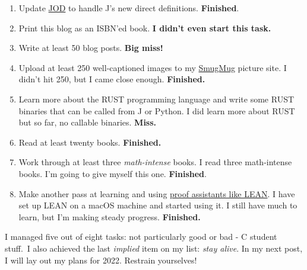 \begin{enumerate}
\def\labelenumi{\arabic{enumi}.}
\tightlist
\item
  Update
  \href{https://analyzethedatanotthedrivel.org/the-jod-page/}{JOD} to
  handle J's new direct definitions. \textbf{Finished}.
\item
  Print this blog as an ISBN'ed book. \textbf{I didn't even start this
  task.}
\item
  Write at least 50 blog posts. \textbf{Big miss!}
\item
  Upload at least 250 well-captioned images to my
  \href{https://conceptcontrol.smugmug.com/}{SmugMug} picture site. I
  didn't hit 250, but I came close enough. \textbf{Finished.}
\item
  Learn more about the RUST programming language and write some RUST
  binaries that can be called from J or Python. I did learn more about
  RUST but so far, no callable binaries. \textbf{Miss.}
\item
  Read at least twenty books. \textbf{Finished.}
\item
  Work through at least three \emph{math-intense} books. I read three
  math-intense books. I'm going to give myself this one.
  \textbf{Finished}.
\item
  Make another pass at learning and using
  \href{https://leanprover-community.github.io/}{proof assistants like
  LEAN}. I have set up LEAN on a macOS machine and started using it. I
  still have much to learn, but I'm making steady progress.
  \textbf{Finished.}
\end{enumerate}

I managed five out of eight tasks: not particularly good or bad - C
student stuff.~I also achieved the last \emph{implied} item on my list:
\emph{stay alive}. In my next post, I will lay out my plans for 2022.
Restrain yourselves!


%

 
